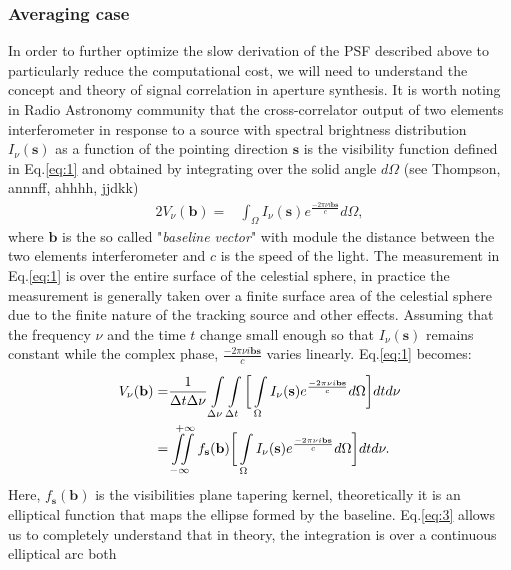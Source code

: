 \subsubsection{Averaging case}
In order to further optimize the slow derivation of the PSF described above to particularly reduce the computational
cost, we will need to understand the concept and theory of signal correlation in aperture synthesis.
It is worth noting in Radio Astronomy community that the cross-correlator output of two elements interferometer
in response to a source with spectral brightness distribution $I_{\nu}(\mathbf{s})$ as a function of the pointing direction $\mathbf{s}$ 
is the visibility function defined in Eq.\ref{eq:1} and obtained by integrating
over the solid angle $d\Omega$ (see Thompson, annnff, ahhhh, jjdkk)
\begin{alignat}{2}
V_{\nu}(\mathbf{b}) =& \int_{\Omega}I_{\nu}(\mathbf{s})e^{\frac{-2\pi\nu i \mathbf{b}\mathbf{s}}{c}}d\Omega, \label{eq:1}
\end{alignat}
where $\mathbf{b}$  is the so called "\textit{baseline vector}" with module the distance between the two elements
interferometer and $c$ is the speed of the light. The measurement in Eq.\ref{eq:1} is over the entire 
surface of the celestial sphere, in practice the measurement is generally taken over a finite surface area of 
the celestial sphere due to the  
finite nature of the tracking source and other effects. Assuming that the frequency $\nu$ and the 
time $t$ change small  enough so that $I_{\nu}(\mathbf{s})$
remains constant while the complex phase, $\frac{-2\pi\nu i \mathbf{b}\mathbf{s}}{c}$ varies linearly.   Eq.\ref{eq:1} becomes:
\begin{alignat}{2}
V_{\nu}(\mathbf{b}) =& \frac{1}{\Delta t \Delta \nu}\int\limits_{\Delta \nu}^{}\int\limits_{\Delta t}^{}\bigg[\int\limits_{\Omega}^{}I_{\nu}(\mathbf{s})e^{\frac{-2\pi\nu i \mathbf{b}\mathbf{s}}{c}} d\Omega\bigg] dt d\nu \label{eq:2}\\	    
		    =& \iint\limits_{-\infty}^{\hspace{.3cm}+\infty}f_{\mathbf{s}}(\mathbf{b})\bigg[\int\limits_{\Omega}^{}I_{\nu}(\mathbf{s})e^{\frac{-2\pi\nu i \mathbf{b}\mathbf{s}}{c}}d\Omega \bigg]dt d\nu  \label{eq:3}.
\end{alignat}
Here, $f_{\mathbf{s}}(\mathbf{b})$ is the visibilities plane tapering kernel,
theoretically it is an elliptical function that
maps the ellipse formed by the baseline.
Eq.\ref{eq:3} allows us to completely understand that in theory, the integration is over a continuous elliptical arc both
